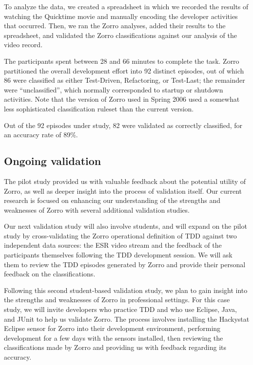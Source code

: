 \documentclass[smallextended]{svjour3}     %
\begin{document}
To analyze the data, we created a spreadsheet in which we recorded the
results of watching the Quicktime movie and manually encoding the developer
activities that occurred.  Then, we ran the Zorro analyses, added their
results to the spreadsheet, and validated the Zorro classifications against
our analysis of the video record.

The participants spent between 28 and 66 minutes to complete the task.
Zorro partitioned the overall development effort into 92 distinct episodes,
out of which 86 were classified as either Test-Driven, Refactoring, or
Test-Last; the remainder were ``unclassified'', which normally corresponded
to startup or shutdown activities.  Note that the version of Zorro used in
Spring 2006 used a somewhat less sophisticated classification ruleset than
the current version.

Out of the 92 episodes under study, 82 were validated as correctly
classified, for an accuracy rate of 89\%.

\subsection{Ongoing validation}

The pilot study provided us with valuable feedback about the potential
utility of Zorro, as well as deeper insight into the process of validation
itself.  Our current research is focused on enhancing our understanding of
the strengths and weaknesses of Zorro with several additional validation
studies.

Our next validation study will also involve students, and will expand on
the pilot study by cross-validating the Zorro operational definition of TDD
against two independent data sources: the ESR video stream and the feedback
of the participants themselves following the TDD development session.  We
will ask them to review the TDD episodes generated by Zorro and provide
their personal feedback on the classifications.

Following this second student-based validation study, we plan to gain
insight into the strengths and weaknesses of Zorro in professional
settings.  For this case study, we will invite developers who
practice TDD and who use Eclipse, Java, and JUnit to help us validate
Zorro.  The process involves installing the Hackystat Eclipse sensor for
Zorro into their development environment, performing development for a few
days with the sensors installed, then reviewing the classifications made by
Zorro and providing us with feedback regarding its accuracy.
\end{document}
